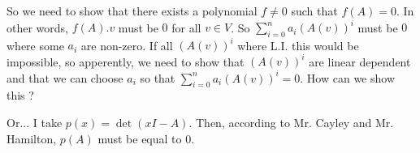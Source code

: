 So we need to show that there exists a polynomial $f \neq 0$ such that $f(A) = 0$. In other words, $f(A).v$ must be $0$ for all $v\in V$. So $\sum_{i=0}^n a_i (A(v))^i$ must be $0$ where some $a_i$ are non-zero. If all $(A(v))^i$ where L.I. this would be impossible, so apperently, we need to show that $(A(v))^i$ are linear dependent and that we can choose $a_i$ so that $\sum_{i=0}^n a_i (A(v))^i=0$. How can we show this ?

Or... I take $p(x)=\det(xI-A)$. Then, according to Mr. Cayley and Mr. Hamilton, $p(A)$ must be equal to $0$. 